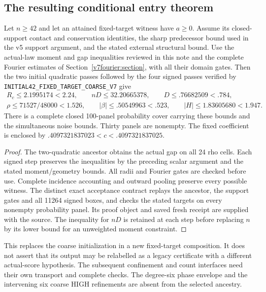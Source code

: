 \subsection{The resulting conditional entry theorem}
\begin{theorem}\label{v7:entry}
Let $n\ge42$ and let an attained fixed-target witness have $a\ge0$.
Assume its closed-support contact and conservation identities, the sharp
predecessor bound used in the v5 support argument, and the stated external
structural bound. Use the actual-law moment and gap inequalities reviewed
in this note and the complete Fourier estimates of
Section~\ref{v7fourier:section}, with all their domain gates.
Then the two initial quadratic passes followed by the four signed passes
verified by \texttt{INITIAL42\_FIXED\_TARGET\_COARSE\_V7} give
\begin{gather*}
 R_c\le2.1995174<2.24,\qquad nD\le32.20665378,
 \qquad D\le .76682509<.784,\\
 \rho\le71527/48000<1.526,\qquad
 |\beta|\le .50549963<.523,\qquad |H|\le1.83605680<1.947.
\end{gather*}
There is a complete closed 100-panel probability cover carrying these
bounds and the simultaneous noise bounds. Thirty panels are nonempty.
The fixed coefficient is enclosed by
$.4097321837023<c<.4097321837025$.
\end{theorem}
\begin{proof}
The two-quadratic ancestor obtains the actual gap on all 24 rho cells.
Each signed step preserves the inequalities by the preceding scalar
argument and the stated moment/geometry bounds. All radii and Fourier
gates are checked before use. Complete incidence accounting and outward
pooling preserve every possible witness. The distinct exact acceptance
contract replays the ancestor, the support gates and all 11264 signed
boxes, and checks the stated targets on every nonempty probability panel.
Its proof object and saved fresh receipt are supplied with the source.
The inequality for $nD$ is retained at each step before replacing $n$ by
its lower bound for an unweighted moment constraint.
\end{proof}

This replaces the coarse initialization in a new fixed-target
composition. It does not assert that its output may be relabelled as a
legacy certificate with a different actual-score hypothesis. The
subsequent confinement and count interfaces need their own transport and
complete checks. The degree-six phase envelope and the intervening six
coarse HIGH refinements are absent from the selected ancestry.
